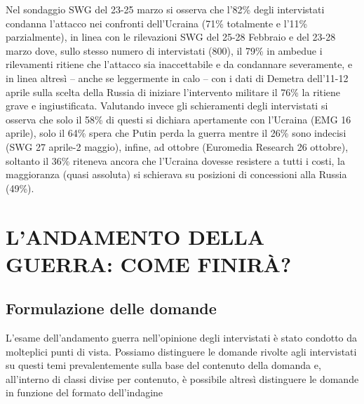 \documentclass[
]{book}
\begin{document}
Nel sondaggio SWG del 23-25 marzo si osserva che l'82\% degli intervistati condanna l'attacco nei confronti dell'Ucraina (71\% totalmente e l'11\% parzialmente), in linea con le rilevazioni SWG del 25-28 Febbraio e del 23-28 marzo dove, sullo stesso numero di intervistati (800), il 79\% in ambedue i rilevamenti ritiene che l'attacco sia inaccettabile e da condannare severamente, e in linea altresì -- anche se leggermente in calo -- con i dati di Demetra dell'11-12 aprile sulla scelta della Russia di iniziare l'intervento militare il 76\% la ritiene grave e ingiustificata. Valutando invece gli schieramenti degli intervistati si osserva che solo il 58\% di questi si dichiara apertamente con l'Ucraina (EMG 16 aprile), solo il 64\% spera che Putin perda la guerra mentre il 26\% sono indecisi (SWG 27 aprile-2 maggio), infine, ad ottobre (Euromedia Research 26 ottobre), soltanto il 36\% riteneva ancora che l'Ucraina dovesse resistere a tutti i costi, la maggioranza (quasi assoluta) si schierava su posizioni di concessioni alla Russia (49\%).

\hypertarget{landamento-della-guerra-come-finiruxe0}{%
\chapter{L'ANDAMENTO DELLA GUERRA: COME FINIRÀ?}\label{landamento-della-guerra-come-finiruxe0}}

\hypertarget{formulazione-delle-domande-2}{%
\section{Formulazione delle domande}\label{formulazione-delle-domande-2}}

L'esame dell'andamento guerra nell'opinione degli intervistati è stato condotto da molteplici punti di vista. Possiamo distinguere le domande rivolte agli intervistati su questi temi prevalentemente sulla base del contenuto della domanda e, all'interno di classi divise per contenuto, è possibile altresì distinguere le domande in funzione del formato dell'indagine
\end{document}
